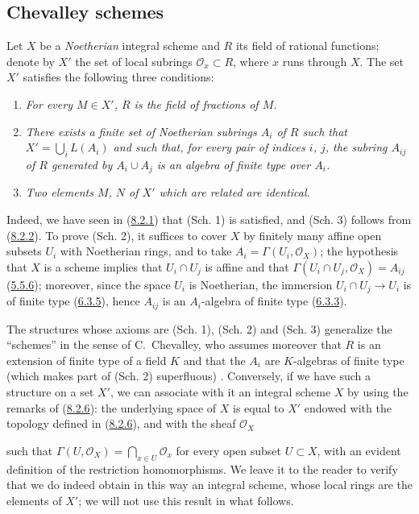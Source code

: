 \subsection{Chevalley schemes}
\label{subsection:I.8.3}

\begin{env}[8.3.1]
\label{I.8.3.1}
Let $X$ be a \emph{Noetherian} integral scheme and $R$ its field of rational
functions; denote by $X'$ the set of local subrings
$\mathscr{O}_x\subset R$, where $x$ runs through $X$. The set $X'$ satisfies
the following three conditions:
\begin{enumerate}
  \item[(Sch. 1)] \emph{For every $M\in X'$, $R$ is the field of fractions
    of $M$.}
  \item[(Sch. 2)] \emph{There exists a finite set of Noetherian subrings
    $A_i$ of $R$ such that $X'=\bigcup_i L(A_i)$ and such that, for every pair
    of indices $i$, $j$, the subring $A_{ij}$ of $R$ generated by
    $A_i\cup A_j$ is an algebra of finite type over $A_i$.}
  \item[(Sch. 3)] \emph{Two elements $M$, $N$ of $X'$ which are related
    are identical.}
\end{enumerate}
\end{env}

Indeed, we have seen in (\hyperref[I.8.2.1]{8.2.1}) that (Sch. 1) is
satisfied, and (Sch. 3) follows from (\hyperref[I.8.2.2]{8.2.2}). To
prove (Sch. 2), it suffices to cover $X$ by finitely many affine open
subsets $U_i$ with Noetherian rings, and to take
$A_i=\Gamma(U_i,\mathscr{O}_X)$; the hypothesis that $X$ is a scheme implies
that $U_i\cap U_j$ is affine and that
$\Gamma(U_i\cap U_j,\mathscr{O}_X)=A_{ij}$
(\hyperref[I.5.5.6]{5.5.6}); moreover, since the space $U_i$ is
Noetherian, the immersion $U_i\cap U_j\to U_i$ is of finite type
(\hyperref[I.6.3.5]{6.3.5}), hence $A_{ij}$ is an $A_i$-algebra of finite
type (\hyperref[I.6.3.3]{6.3.3}).

\begin{env}[8.3.2]
\label{I.8.3.2}
The structures whose axioms are (Sch. 1), (Sch. 2) and (Sch. 3)
generalize the ``schemes'' in the sense of C.~Chevalley, who assumes moreover
that $R$ is an extension of finite type of a field $K$ and that the $A_i$ are
$K$-algebras of finite type (which makes part of (Sch. 2) superfluous)
\cite{I-1}. Conversely, if we have such a structure on a set $X'$, we can
associate with it an integral scheme $X$ by using the remarks of
(\hyperref[I.8.2.6]{8.2.6}): the underlying space of $X$ is equal to $X'$
endowed with the topology defined in (\hyperref[I.8.2.6]{8.2.6}), and with
the sheaf $\mathscr{O}_X$

such that $\Gamma(U,\mathscr{O}_X)=\bigcap_{x\in U}\mathscr{O}_x$ for every
open subset $U\subset X$, with an evident definition of the restriction
homomorphisms. We leave it to the reader to verify that we do indeed obtain
in this way an integral scheme, whose local rings are the elements of $X'$;
we will not use this result in what follows.
\end{env}
